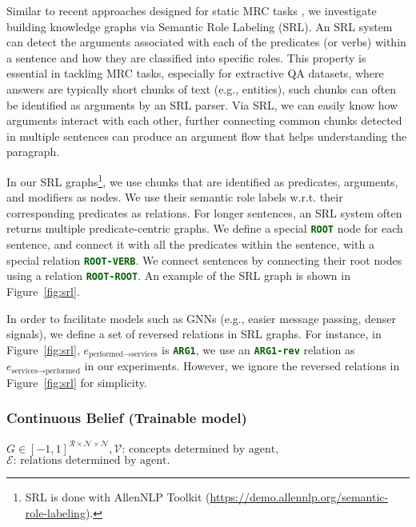 \documentclass[11pt]{article}
\newcommand{\code}[1]{\texttt{#1}}
\newcommand{\cmd}[1]{\textcolor{darkgreen}{\textbf{\small{\code{#1}}}}}
\begin{document}
Similar to recent approaches designed for static MRC tasks \cite{zheng2020srlgrn,zhang2020semantics}, we investigate building knowledge graphs via Semantic Role Labeling (SRL).
An SRL system \citep{shi2019simple} can detect the arguments associated with each of the predicates (or verbs) within a sentence and how they are classified into specific roles.
This property is essential in tackling MRC tasks, especially for extractive QA datasets, where answers are typically short chunks of text (e.g., entities), such chunks can often be identified as arguments by an SRL parser.
Via SRL, we can easily know how arguments interact with each other, further connecting common chunks detected in multiple sentences can produce an argument flow that helps understanding the paragraph.

In our SRL graphs\footnote{SRL is done with AllenNLP Toolkit (\url{https://demo.allennlp.org/semantic-role-labeling}).}, we use chunks that are identified as predicates, arguments, and modifiers as nodes. 
We use their semantic role labels w.r.t. their corresponding predicates as relations.
For longer sentences, an SRL system often returns multiple predicate-centric graphs.
We define a special \cmd{ROOT} node for each sentence, and connect it with all the predicates within the sentence, with a special relation \cmd{ROOT-VERB}.
We connect sentences by connecting their root nodes using a relation \cmd{ROOT-ROOT}.
An example of the SRL graph is shown in Figure~\ref{fig:srl}.

In order to facilitate models such as GNNs (e.g., easier message passing, denser signals), we define a set of reversed relations in SRL graphs.
For instance, in Figure~\ref{fig:srl}, $e_{\text{performed} \rightarrow \text{services}}$ is \cmd{ARG1}, we use an \cmd{ARG1-rev} relation as $e_{\text{services} \rightarrow \text{performed}}$ in our experiments.
However, we ignore the reversed relations in Figure~\ref{fig:srl} for simplicity.


\subsubsection{Continuous Belief \textbf{\small{(Trainable model)}}}
\label{subsection:gata}
\begin{center}
    \textcolor{blue1}{\textbf{\small{$G \in [-1, 1]^{\mathcal{R} \times \mathcal{N} \times \mathcal{N}}, \mathcal{V}\text{: concepts determined by agent},$}}}\\
    \textcolor{blue1}{\textbf{\small{$\mathcal{E}\text{: relations determined by agent.}$}}}
\end{center}
\end{document}
